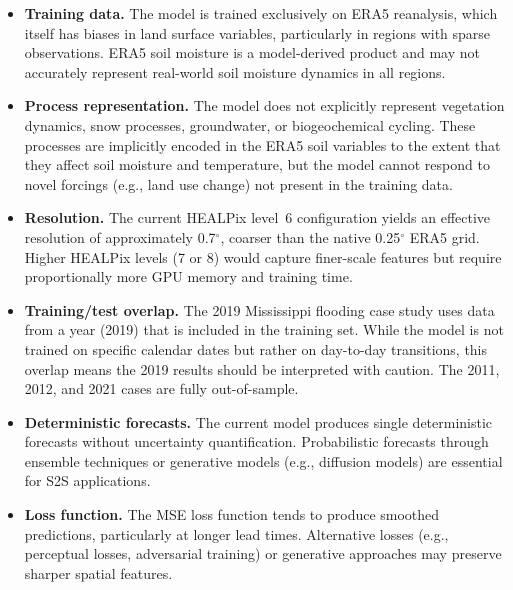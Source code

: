 \documentclass[11pt]{article}
\begin{document}
\begin{itemize}
    \item \textbf{Training data.} The model is trained exclusively on ERA5 reanalysis, which itself has biases in land surface variables, particularly in regions with sparse observations. ERA5 soil moisture is a model-derived product and may not accurately represent real-world soil moisture dynamics in all regions.

    \item \textbf{Process representation.} The model does not explicitly represent vegetation dynamics, snow processes, groundwater, or biogeochemical cycling. These processes are implicitly encoded in the ERA5 soil variables to the extent that they affect soil moisture and temperature, but the model cannot respond to novel forcings (e.g., land use change) not present in the training data.

    \item \textbf{Resolution.} The current HEALPix level~6 configuration yields an effective resolution of approximately 0.7$^\circ$, coarser than the native 0.25$^\circ$ ERA5 grid. Higher HEALPix levels (7 or 8) would capture finer-scale features but require proportionally more GPU memory and training time.

    \item \textbf{Training/test overlap.} The 2019 Mississippi flooding case study uses data from a year (2019) that is included in the training set. While the model is not trained on specific calendar dates but rather on day-to-day transitions, this overlap means the 2019 results should be interpreted with caution. The 2011, 2012, and 2021 cases are fully out-of-sample.

    \item \textbf{Deterministic forecasts.} The current model produces single deterministic forecasts without uncertainty quantification. Probabilistic forecasts through ensemble techniques or generative models (e.g., diffusion models) are essential for S2S applications.

    \item \textbf{Loss function.} The MSE loss function tends to produce smoothed predictions, particularly at longer lead times. Alternative losses (e.g., perceptual losses, adversarial training) or generative approaches may preserve sharper spatial features.
\end{itemize}
\end{document}
